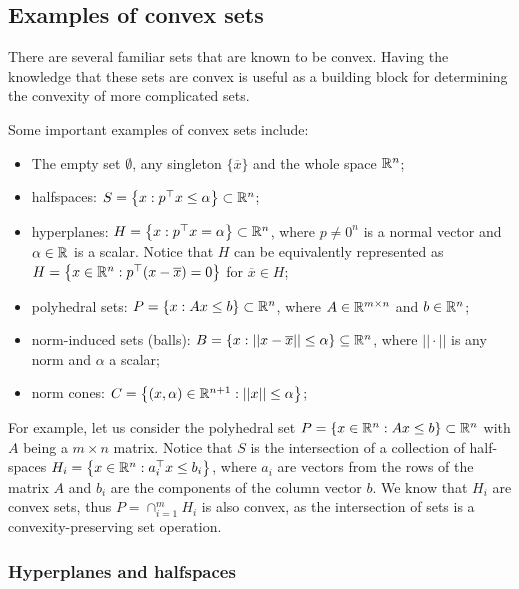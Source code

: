 \subsection{Examples of convex sets}

There are several familiar sets that are known to be convex. Having the knowledge that these sets are convex is useful as a building block for determining the convexity of more complicated sets.

Some important examples of convex sets include:
\begin{itemize}
	\item The empty set $\emptyset$, any singleton $\{\overline{x}\}$ and the whole space $\mathbb{R}^n$; 
	\item halfspaces: $S = \left\{ x : p^\top x \leq \alpha \right \} \subset \mathbb{R}^n$;
	\item hyperplanes: $H = \left\{ x : p^\top x = \alpha \right \} \subset \mathbb{R}^n$, where $p \neq 0^n$ is a normal vector and $\alpha\in \mathbb{R}$ is a scalar. Notice that $H$ can be equivalently represented as $H = \left\{ x \in \mathbb{R}^n: p^\top(x - \overline{x}) = 0 \right \}$ for $\overline{x} \in H$;
	\item polyhedral sets: $P = \left\{ x : Ax \leq b \right \} \subset \mathbb{R}^n$, where $A\in \mathbb{R}^{m\times n}$ and $b \in \mathbb{R}^n$;
	\item norm-induced sets (balls): $B = \left\{ x : ||x - \overline{x}|| \leq \alpha \right \} \subseteq \mathbb{R}^n$, where $|| \cdot ||$ is any norm and $\alpha$ a scalar;
	\item norm cones: $C =\left\{ (x,\alpha) \in \mathbb{R}^{n+1}: ||x|| \leq \alpha \right \} $;
\end{itemize} 

For example, let us consider the polyhedral set $P = \left\{ x \in \mathbb{R}^n : Ax \leq b \right \} \subset \mathbb{R}^n$ with $A$ being a $m \times n$ matrix. Notice that $S$ is the intersection of a collection of half-spaces $H_i = \left\{ x \in \mathbb{R}^n : a_i^\top x \leq b_i \right \}$, where $a_i$ are vectors from the rows of the matrix $A$ and $b_i$ are the components of the column vector $b$. We know that $H_i$ are convex sets, thus $P = \cap_{i=1}^m H_i$ is also convex, as the intersection of sets is a convexity-preserving set operation.


\subsubsection{Hyperplanes and halfspaces}

